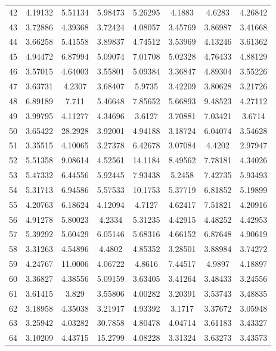 \begin{center}
\begin{longtable}{cccccccc}
42 & 4.19132 & 5.51134 & 5.98473 & 5.26295 & 4.1883 & 4.6283 & 4.26842\\
43 & 3.72886 & 4.39368 & 3.72424 & 4.08057 & 3.45769 & 3.86987 & 3.41668\\
44 & 3.66258 & 5.41558 & 3.89837 & 4.74512 & 3.53969 & 4.13246 & 3.61362\\
45 & 4.94472 & 6.87994 & 5.09074 & 7.01708 & 5.02328 & 4.76433 & 4.88129\\
46 & 3.57015 & 4.64003 & 3.55801 & 5.09384 & 3.36847 & 4.89304 & 3.55226\\
47 & 3.63731 & 4.2307 & 3.68407 & 5.9735 & 3.42209 & 3.80628 & 3.21726\\
48 & 6.89189 & 7.711 & 5.46648 & 7.85652 & 5.66893 & 9.48523 & 4.27112\\
49 & 3.99795 & 4.11277 & 4.34696 & 3.6127 & 3.70881 & 7.03421 & 3.6714\\
50 & 3.65422 & 28.2928 & 3.92001 & 4.94188 & 3.18724 & 6.04074 & 3.54628\\
51 & 3.35515 & 4.10065 & 3.27378 & 6.42678 & 3.07084 & 4.4202 & 2.97947\\
52 & 5.51358 & 9.08614 & 4.52561 & 14.1184 & 8.49562 & 7.78181 & 4.34026\\
53 & 5.47332 & 6.44556 & 5.92445 & 7.93438 & 5.2458 & 7.42735 & 5.93493\\
54 & 5.31713 & 6.94586 & 5.57533 & 10.1753 & 5.37719 & 6.81852 & 5.19899\\
55 & 4.20763 & 6.18624 & 4.12094 & 4.7127 & 4.62417 & 7.51821 & 4.20916\\
56 & 4.91278 & 5.80023 & 4.2334 & 5.31235 & 4.42915 & 4.48252 & 4.42953\\
57 & 5.39292 & 5.60429 & 6.05146 & 5.68316 & 4.66152 & 6.87648 & 4.90619\\
58 & 3.31263 & 4.54896 & 4.4802 & 4.85352 & 3.28501 & 3.88984 & 3.74272\\
59 & 4.24767 & 11.0006 & 4.06722 & 4.8616 & 7.44517 & 4.9897 & 4.18897\\
60 & 3.36827 & 4.38556 & 5.09159 & 3.63405 & 3.41264 & 3.48433 & 3.24556\\
61 & 3.61415 & 3.829 & 3.55806 & 4.00282 & 3.20391 & 3.53743 & 3.48835\\
62 & 3.18958 & 4.35038 & 3.21917 & 4.93392 & 3.1717 & 3.37672 & 3.05948\\
63 & 3.25942 & 4.03282 & 30.7858 & 4.80478 & 4.04714 & 3.61183 & 3.43327\\
64 & 3.10209 & 4.43715 & 15.2799 & 4.08228 & 3.31324 & 3.63273 & 3.43573\\

\end{longtable}
\end{center}
